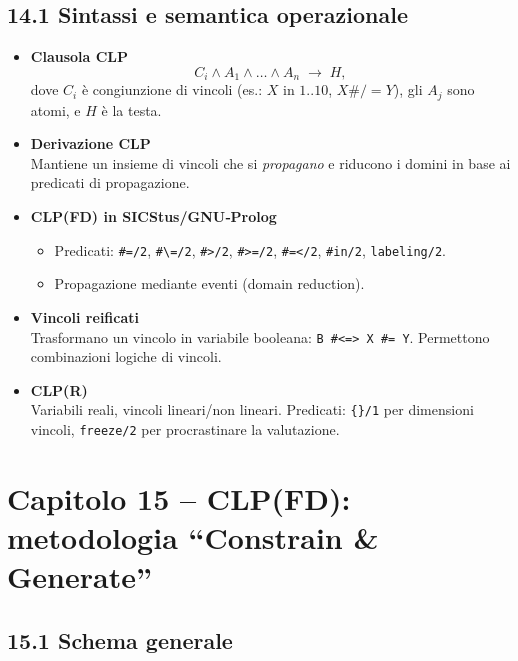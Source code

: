 \documentclass[12pt]{article}
\begin{document}
\subsection*{14.1 Sintassi e semantica operazionale}

\begin{itemize}
  \item \textbf{Clausola CLP}\\
    \[
      C_i \land A_1 \land \dots \land A_n \; \to \; H,
    \]
    dove $C_i$ è congiunzione di vincoli (es.: $X \text{ in } 1..10$, $X \#\!/ = Y$), gli $A_j$ sono atomi, e $H$ è la testa.
  \item \textbf{Derivazione CLP}\\
    Mantiene un insieme di vincoli che si \emph{propagano} e riducono i domini in base ai predicati di propagazione.

  \item \textbf{CLP(FD) in SICStus/GNU‐Prolog}\\
    \begin{itemize}
      \item Predicati: \texttt{\#=/2}, \texttt{\#\textbackslash =/2}, \texttt{\#>/2}, \texttt{\#>=/2}, \texttt{\#=</2}, \texttt{\#in/2}, \texttt{labeling/2}.
      \item Propagazione mediante eventi (domain reduction).
    \end{itemize}

  \item \textbf{Vincoli reificati}\\
    Trasformano un vincolo in variabile booleana: \texttt{B \#<=> X \#= Y}. Permettono combinazioni logiche di vincoli.

  \item \textbf{CLP(R)}\\
    Variabili reali, vincoli lineari/non lineari. Predicati: \texttt{\{\}/1} per dimensioni vincoli, \texttt{freeze/2} per procrastinare la valutazione.
\end{itemize}

\section*{Capitolo 15 – CLP(FD): metodologia ``Constrain \& Generate''}

\subsection*{15.1 Schema generale}
\end{document}
